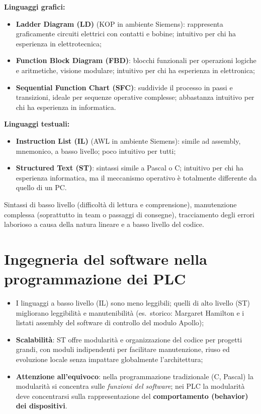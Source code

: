\begin{note}
\textbf{Linguaggi grafici:}
\begin{itemize}
    \item \textbf{Ladder Diagram (LD)} (KOP in ambiente Siemens): rappresenta graficamente circuiti elettrici con contatti e bobine; intuitivo per chi ha esperienza in elettrotecnica;
    \item \textbf{Function Block Diagram (FBD)}: blocchi funzionali per operazioni logiche e aritmetiche, visione modulare; intuitivo per chi ha esperienza in elettronica;
    \item \textbf{Sequential Function Chart (SFC)}: suddivide il processo in passi e transizioni, ideale per sequenze operative complesse; abbastanza intuitivo per chi ha esperienza in informatica.
\end{itemize}
\textbf{Linguaggi testuali:}
\begin{itemize}
    \item \textbf{Instruction List (IL)} (AWL in ambiente Siemens): simile ad assembly, mnemonico, a basso livello; poco intuitivo per tutti;
    \item \textbf{Structured Text (ST)}: sintassi simile a Pascal o C; intuitivo per chi ha esperienza informatica, ma il meccanismo operativo è totalmente differente da quello di un PC.
\end{itemize}
\end{note}

\begin{note}
Sintassi di basso livello (difficoltà di lettura e comprensione), manutenzione complessa (soprattutto in team o passaggi di consegne), tracciamento degli errori laborioso a causa della natura lineare e a basso livello del codice.
\end{note}

\section{Ingegneria del software nella programmazione dei PLC}
\begin{itemize}
    \item I linguaggi a basso livello (IL) sono meno leggibili; quelli di alto livello (ST) migliorano leggibilità e manutenibilità (es.\ storico: Margaret Hamilton e i listati assembly del software di controllo del modulo Apollo);
    \item \textbf{Scalabilità}: ST offre modularità e organizzazione del codice per progetti grandi, con moduli indipendenti per facilitare manutenzione, riuso ed evoluzione locale senza impattare globalmente l'architettura;
    \item \textbf{Attenzione all'equivoco}: nella programmazione tradizionale (C, Pascal) la modularità si concentra sulle \emph{funzioni del software}; nei PLC la modularità deve concentrarsi sulla rappresentazione del \textbf{comportamento (behavior) dei dispositivi}.
\end{itemize}


